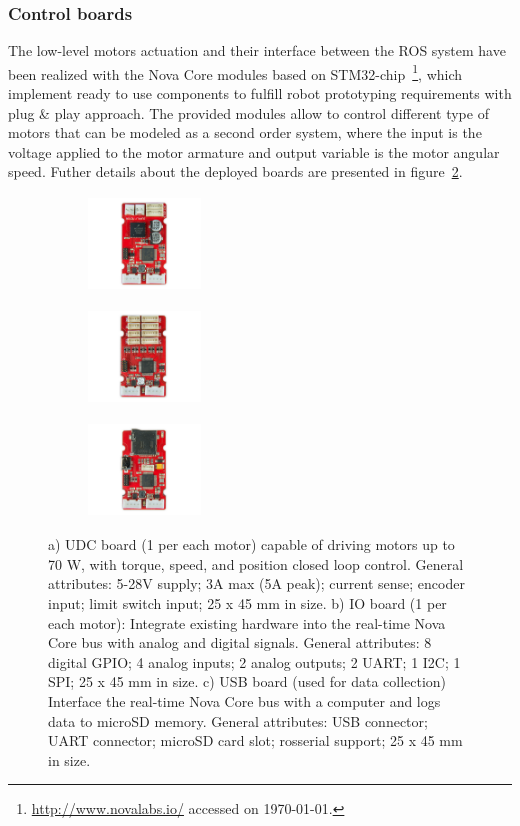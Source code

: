 \subsubsection{Control boards}\label{novacore}
The low-level motors actuation and their interface between the ROS system have been realized with the Nova Core modules based on STM32-chip~\footnote{\url{http://www.novalabs.io/} accessed on \today.}, which implement ready to use components to fulfill robot prototyping requirements with plug \& play approach.  
The provided modules allow to control different type of motors that can be modeled as a second order system, where the input is the voltage applied to the motor armature and output variable is the motor angular speed. Futher details about the deployed boards are presented in figure~\ref{fig:boards}.

\begin{figure}[ht]
  \centering
  \begin{subfigure}[b]{0.3\textwidth}
  \centering
      \includegraphics[width=3cm,height=2.5cm]{images/03-foundation/udc}
	\caption{}
  \end{subfigure}
  \begin{subfigure}[b]{0.3\textwidth}
  \centering
      \includegraphics[width=3cm,height=2.5cm]{images/03-foundation/io}
	\caption{}
  \end{subfigure}
  \begin{subfigure}[b]{0.3\textwidth}
  \centering
      \includegraphics[width=3cm,height=2.5cm]{images/03-foundation/usb}
	\caption{}
	\label{fig:usb_board}
  \end{subfigure}
  \caption{a) UDC board (1 per each motor) capable of driving motors up to 70 W, with torque, speed, and position closed loop control. General attributes: 5-28V supply; 3A max (5A peak); current sense; encoder input; limit switch input; 25 x 45 mm in size. b) IO board (1 per each motor): Integrate existing hardware into the real-time Nova Core bus with analog and digital signals. General attributes: 8 digital GPIO;  4 analog inputs; 2 analog outputs; 2 UART; 1 I2C; 1 SPI; 25 x 45 mm in size. c) USB board (used for data collection) Interface the real-time Nova Core bus with a computer and logs data to microSD memory. General attributes: USB connector;  UART connector; microSD card slot; rosserial support; 25 x 45 mm in size.}
  \label{fig:boards}
\end{figure}

